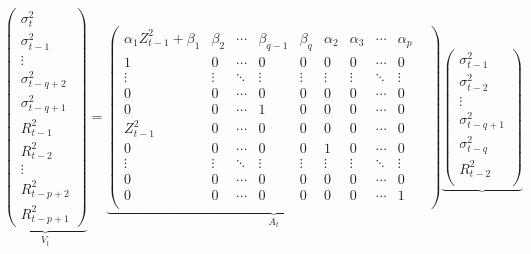 \documentclass[aoas,preprint]{imsart}
\numberwithin{equation}{section}
\theoremstyle{plain}
\begin{document}
\begin{small}
  \begin{equation*}
    \underbrace{
      \begin{pmatrix}
        \sigma_{t}^2 \\
        \sigma_{t-1}^2 \\
        \vdots \\
        \sigma_{t-q+2}^2 \\
        \sigma_{t-q+1}^2 \\
        R_{t-1}^2 \\
        R_{t-2}^2 \\
        \vdots \\
        R_{t-p+2}^2 \\
        R_{t-p+1}^2
      \end{pmatrix}}_{V_t} =
    \underbrace{
      \begin{pmatrix}
        \alpha_1 Z_{t-1}^2 + \beta_1 & \beta_2 & \cdots &
        \beta_{q-1} & \beta_q & \alpha_2 & \alpha_3 & \cdots & \alpha_p \\
        1 & 0 & \cdots & 
        0 & 0 & 0 & 0 & \cdots & 0 & \\
        \vdots & \vdots & \ddots & 
        \vdots & \vdots & \vdots & \vdots & \ddots & \vdots \\
        0 & 0 & \cdots &
        0 & 0 & 0 & 0 & \cdots & 0 & \\
        0 & 0 & \cdots &
        1 & 0 & 0 & 0 & \cdots & 0 & \\
        Z_{t-1}^2 & 0 & \cdots &
        0 & 0 & 0 & 0 & \cdots & 0 & \\
        0 & 0 & \cdots &
        0 & 0 & 1 & 0 & \cdots & 0 \\
        \vdots & \vdots & \ddots &
        \vdots & \vdots & \vdots & \vdots & \ddots & \vdots \\
        0 & 0 & \cdots &
        0 & 0 & 0 & 0 & \cdots & 0 \\    
        0 & 0 & \cdots &
        0 & 0 & 0 & 0 & \cdots & 1 \\    
      \end{pmatrix}
    }_{A_t}
    \underbrace{
      \begin{pmatrix}
        \sigma_{t-1}^2 \\
        \sigma_{t-2}^2 \\
        \vdots \\
        \sigma_{t-q+1}^2 \\
        \sigma_{t-q}^2 \\
        R_{t-2}^2 \\

\end{pmatrix}}
\end{equation*}
\end{small}
\end{document}
